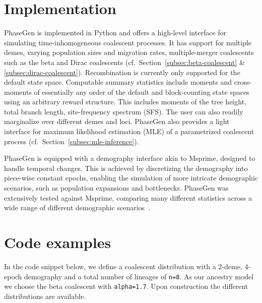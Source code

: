 \documentclass[hidelinks,11pt]{article}
\begin{document}


    \section{Implementation}\label{sec:implementation}
    PhaseGen is implemented in Python and offers a high-level interface for simulating time-inhomogeneous coalescent processes.
    It has support for multiple demes, varying population sizes and migration rates, multiple-merger coalescents such as the beta and Dirac coalescents (cf.\ Section~\ref{subsec:beta-coalescent} \& \ref{subsec:dirac-coalescent}).
    Recombination is currently only supported for the default state space.
    Computable summary statistics include moments and cross-moments of essentially any order of the default and block-counting state spaces using an arbitrary reward structure.
    This includes moments of the tree height, total branch length, site-frequency spectrum (SFS).
    The user can also readily marginalize over different demes and loci.
    PhaseGen also provides a light interface for maximum likelihood estimation (MLE) of a parametrized coalescent process (cf.\ Section~\ref{subsec:mle-inference}).

    PhaseGen is equipped with a demography interface akin to Msprime, designed to handle temporal changes.
    This is achieved by discretizing the demography into piece-wise constant epochs, enabling the simulation of more intricate demographic scenarios, such as population expansions and bottlenecks.
    PhaseGen was extensively tested against Msprime, comparing many different statistics across a wide range of different demographic scenarios~\citep{msprime}.


    \section{Code examples}\label{sec:code-examples}

    In the code snippet below, we define a coalescent distribution with a 2-deme, 4-epoch demography and a total number of lineages of \texttt{n=8}.
    As our ancestry model we choose the beta coalescent with \texttt{alpha=1.7}.
    Upon construction the different distributions are available.
\end{document}
